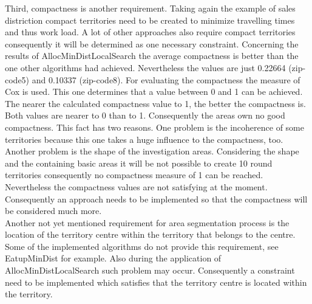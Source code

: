 Third, compactness is another requirement. Taking again the example of sales distriction compact territories need to be created to minimize travelling times and thus work load. A lot of other approaches also require compact territories consequently it will be determined as one necessary constraint. Concerning the results of AllocMinDistLocalSearch the average compactness is better than the one other algorithms had achieved. Nevertheless the values are just 0.22664 (zip-code5) and 0.10337 (zip-code8). For evaluating the compactness the measure of Cox is used. This one determines that a value between 0 and 1 can be achieved. The nearer the calculated compactness value to 1, the better the compactness is. Both values are nearer to 0 than to 1. Consequently the areas own no good compactness. This fact has two reasons. One problem is the incoherence of some territories because this one takes a huge influence to the compactness, too. Another problem is the shape of the investigation areas. Considering the shape and the containing basic areas it will be not possible to create 10 round territories consequently no compactness measure of 1 can be reached. Nevertheless the compactness values are not satisfying at the moment. Consequently an approach needs to be implemented so that the compactness will be considered much more. \\
Another not yet mentioned requirement for area segmentation process is the location of the territory centre within the territory that belongs to the centre. Some of the implemented algorithms do not provide this requirement, see EatupMinDist for example. Also during the application of AllocMinDistLocalSearch such problem may occur. Consequently a constraint need to be implemented which satisfies that the territory centre is located within the territory.

